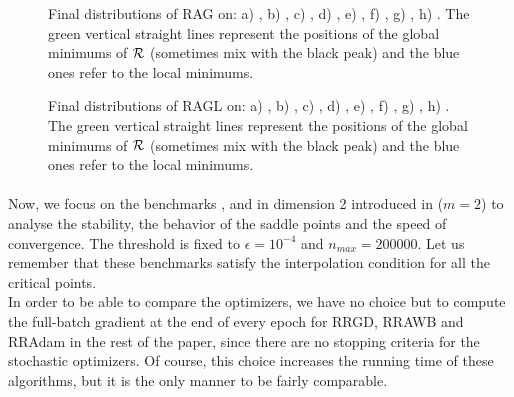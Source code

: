 \begin{figure}[h!]
	\centering
	\scalebox{0.45}{}
	\caption{Final distributions of RAG on: a) \exOne, b) \exTwo, c) \exThree, d) \exFour, e) \exFive, f) \exSix, g) \exSeven, h) \exHeight. The green vertical straight lines represent the positions of the global minimums of $\mathcal{R}$ (sometimes mix with the black peak) and the blue ones refer to the local minimums.}
	\label{RAG_exs}
\end{figure}

\begin{figure}[h!]
	\centering
	\scalebox{0.45}{}
	\caption{Final distributions of RAGL on: a) \exOne, b) \exTwo, c) \exThree, d) \exFour, e) \exFive, f) \exSix, g) \exSeven, h) \exHeight. The green vertical straight lines represent the positions of the global minimums of $\mathcal{R}$ (sometimes mix with the black peak) and the blue ones refer to the local minimums.}
	\label{RAGL_exs}
\end{figure}

\paragraph{}
Now, we focus on the benchmarks \polyTwo, \polyThree and \polyFive in dimension 2 introduced in \cite{Bilel} ($m=2$) to analyse the stability, the behavior of the saddle points and the speed of convergence. The threshold is fixed to $\epsilon=10^{-4}$ and $n_{max}=200000$. Let us remember that these benchmarks satisfy the interpolation condition for all the critical points. \\
In order to be able to compare the optimizers, we have no choice but to compute the full-batch gradient at the end of every epoch for RRGD, RRAWB and RRAdam in the rest of the paper, since there are no stopping criteria for the stochastic optimizers. Of course, this choice increases the running time of these algorithms, but it is the only manner to be fairly comparable.

